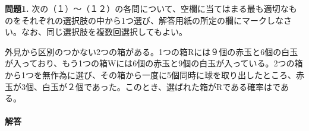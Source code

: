 \documentclass{jsarticle}
\begin{document}
\textbf{問題1.} 次の（１）～（１２）の各問について、空欄に当てはまる最も適切なものをそれぞれの選択肢の中から1つ選び、解答用紙の所定の欄にマークしなさい。なお、同じ選択肢を複数回選択してもよい。

 外見から区別のつかない2つの箱がある。1つの箱Rには９個の赤玉と6個の白玉が入っており、もう1つの箱Wには6個の赤玉と9個の白玉が入っている。2つの箱から1つを無作為に選び、その箱から一度に5個同時に球を取り出したところ、赤玉が3個、白玉が２個であった。このとき、選ばれた箱がRである確率は\fbox{　　　　　}である。

\paragraph{解答} 
\end{document}

